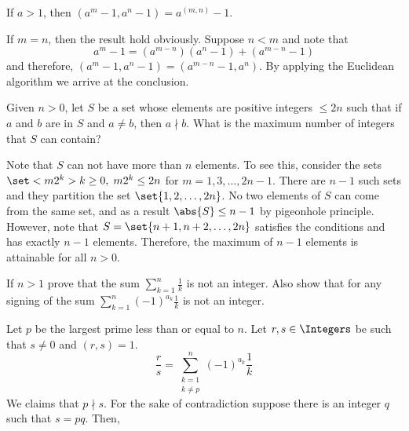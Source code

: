 \begin{exercise}
\begin{solution}
\begin{equation*}
        \end{equation*}
    \end{solution}
    \item If \(a > 1\), then \((a^m -1 , a^n - 1) = a^{(m,n)} - 1\).
    \begin{solution}
        If \(m = n\), then the result hold obviously. Suppose \(n < m\) and note that 
        \begin{equation*}
            a^m - 1 = (a^{m-n})(a^n - 1) + (a^{m-n} - 1)
        \end{equation*}
        and therefore, \((a^m - 1, a^n - 1) = (a^{m - n} - 1 , a^n)\). By applying the Euclidean algorithm we arrive at the conclusion.
    \end{solution}
    \item Given \(n > 0\), let \(S\) be a set whose elements are positive integers \(\leq 2n\) such that if \(a\) and \(b\) are in \(S\) and \(a \neq b\), then \(a \nmid b\). What is the maximum number of integers that \(S\) can contain?
    \begin{solution}
        Note that \(S\) can not have more than \(n\) elements. To see this, consider the sets \(\set<m 2^k>{k \geq 0, \; m 2^k \leq 2n}\) for \(m = 1,3, \dots, 2n - 1\). There are \(n - 1\) such sets and they partition the set \(\set{1, 2 , \dots , 2n}\). No two elements of \(S\) can come from the same set, and as a result \(\abs{S} \leq n - 1\) by pigeonhole principle. However, note that \(S = \set{n+1 , n +2 , \dots , 2n}\) satisfies the conditions and has exactly \(n - 1\) elements. Therefore, the maximum of \(n- 1\) elements is attainable for all \(n > 0\). 
    \end{solution}
    \item If \(n > 1\) prove that the sum \(\sum_{k = 1}^n \frac{1}{k}\) is not an integer. Also show that for any signing of the sum \(\sum_{k = 1}^n (-1)^{a_k} \frac{1}{k}\) is not an integer.
    \begin{solution}
        Let \(p\) be the largest prime less than or equal to \(n\). Let \(r,s \in \Integers\) be such that \(s \neq 0\) and \((r,s) = 1\).
        \begin{equation*}
            \frac{r}{s} = \sum_{\substack{k = 1 \\ k \neq p}}^n (-1)^{a_k}\dfrac{1}{k}
        \end{equation*}
        We claims that \(p \nmid s\). For the sake of contradiction suppose there is an integer \(q\) such that \(s = pq\). Then, 
        \begin{align*}

\end{align*}
\end{solution}
\end{exercise}
